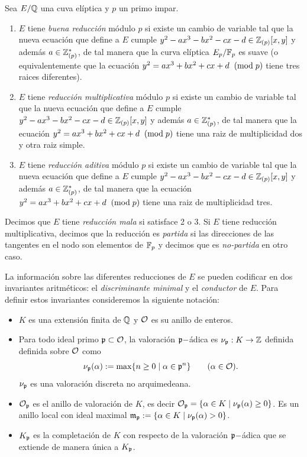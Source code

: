 \begin{defin}\label{def:reduccion}
  Sea $E/\mathbb{Q}$ una cuva el\'iptica y $p$ un primo impar.
  \begin{enumerate}
  \item $E$ tiene \emph{buena reducci\'on} m\'odulo $p$ si existe un cambio de variable tal que
    la nueva ecuaci\'on que define a $E$ cumple $y^2-ax^3-bx^2-cx-d\in\mathbb{Z}_{(p)}[x,y]$ y adem\'as
    $a\in\mathbb{Z}_{(p)}^*$, de tal manera que la curva el\'iptica $E_p/\mathbb{F}_p$ es suave (o equivalentemente
    que la ecuaci\'on $y^2=ax^3+bx^2+cx+d\;\;(\mathrm{mod}\; p)$ tiene tres raices diferentes).
  \item $E$ tiene \emph{reducci\'on multiplicativa} m\'odulo $p$ si existe un cambio de variable
    tal que la nueva ecuaci\'on que define a $E$ cumple $y^2-ax^3-bx^2-cx-d\in\mathbb{Z}_{(p)}[x,y]$ y
    adem\'as $a\in\mathbb{Z}_{(p)}^*$, de tal manera que la ecuaci\'on $y^2=ax^3+bx^2+cx+d\;\;(\mathrm{mod}\; p)$ tiene
    una raiz de multiplicidad dos y otra raiz simple.
  \item $E$ tiene \emph{reducci\'on aditiva} m\'odulo $p$ si existe un cambio de variable
    tal que la nueva ecuaci\'on que define a $E$ cumple $y^2-ax^3-bx^2-cx-d\in\mathbb{Z}_{(p)}[x,y]$ y
    adem\'as $a\in\mathbb{Z}_{(p)}^*$, de tal manera que la ecuaci\'on $y^2=ax^3+bx^2+cx+d\;\;(\mathrm{mod}\; p)$ tiene
    una raiz de multiplicidad tres.
  \end{enumerate}
  Decimos que $E$ tiene \emph{reducci\'on mala} si satisface 2 o 3. Si $E$ tiene reducci\'on
  multiplicativa, decimos que la reducci\'on es \emph{partida} si las direcciones de las tangentes
  en el nodo son elementos de $\mathbb{F}_p$ y decimos que es \emph{no-partida} en otro caso.
\end{defin}

La información sobre las diferentes reducciones de $E$ se pueden codificar en dos invariantes aritméticos: el \emph{discriminante minimal} y el \emph{conductor} de $E$. Para definir estos invariantes consideremos la siguiente notación:
\begin{itemize}
	\item $K$ es una extensión finita de $\mathbb{Q}$ y $\mathcal{O}$ es su anillo de enteros.
	\item Para todo ideal primo $\mathfrak{p}\subset\mathcal{O}$, la valoración $\mathfrak{p}-$ádica es $\nu_{\mathfrak{p}}:K\rightarrow\mathbb{Z}$ definida definida sobre $\mathcal{O}$ como
	\[
		\nu_{\mathfrak{p}}(\alpha):=\max\{n\geq0\mid \alpha\in\mathfrak{p}^n\}\qquad(\alpha\in\mathcal{O}).
	\]
	$\nu_{\mathfrak{p}}$ es una valoración discreta no arquimedeana.
	\item $\mathcal{O}_{\mathfrak{p}}$ es el anillo de valoración de $K$, es decir $\mathcal{O}_{\mathfrak{p}}=\{\alpha\in K\mid \nu_{\mathfrak{p}}(\alpha)\geq0\}$. Es un anillo local con ideal maximal $\mathfrak{m}_{\mathfrak{p}}:=\{\alpha\in K\mid \nu_{\mathfrak{p}}(\alpha)>0\}$.
	\item $K_{\mathfrak{p}}$ es la completación de $K$ con respecto de la valoración $\mathfrak{p}-$ádica que se extiende de manera única a $K_{\mathfrak{p}}$.
\end{itemize}




